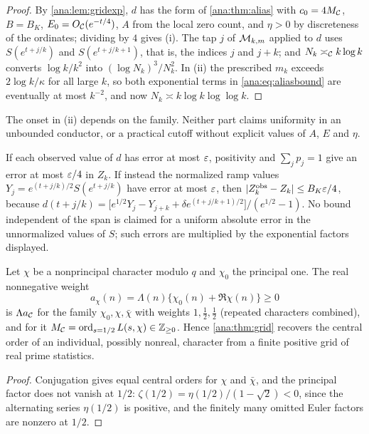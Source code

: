 \begin{proof}
By \cref{ana:lem:gridexp}, $d$ has the form of \cref{ana:thm:alias} with $c_0=4M_{\mathcal{C}}$,
$B=B_K$, $E_0=O_{\mathcal{C}}(e^{-t/4})$, $A$ from the local zero count, and $\eta>0$ by discreteness
of the ordinates; dividing by $4$ gives (i). The tap $j$ of $\mathcal{M}_{k,m}$ applied to $d$ uses
$S(e^{t+j/k})$ and $S(e^{t+j/k+1})$, that is, the indices $j$ and $j+k$; and
$N_k\asymp_{\mathcal{C}} k\log k$ converts $\log k/k^2$ into $(\log N_k)^3/N_k^2$. In (ii) the
prescribed $m_k$ exceeds $2\log k/\kappa$ for all large $k$, so both exponential terms in
\eqref{ana:eq:aliasbound} are eventually at most $k^{-2}$, and now $N_k\asymp k\log k\log\log k$.
\end{proof}

The onset in (ii) depends on the family. Neither part claims uniformity in an unbounded
conductor, or a practical cutoff without explicit values of $A$, $E$ and $\eta$.

\begin{remark}[Noise]\label{ana:rem:gridnoise}
If each observed value of $d$ has error at most $\varepsilon$, positivity and $\sum_jp_j=1$ give an
error at most $\varepsilon/4$ in $Z_k$. If instead the normalized ramp values
$Y_j=e^{(t+j/k)/2}S(e^{t+j/k})$ have error at most $\varepsilon$, then
$\lvert Z_k^{\mathrm{obs}}-Z_k\rvert\le B_K\varepsilon/4$, because
$d(t+j/k)=\bigl[e^{1/2}Y_j-Y_{j+k}+\delta e^{(t+j/k+1)/2}\bigr]/(e^{1/2}-1)$. No bound independent
of the span is claimed for a uniform absolute error in the unnormalized values of $S$; such errors
are multiplied by the exponential factors displayed.
\end{remark}

\begin{corollary}\label{ana:cor:gridchar}
Let $\chi$ be a nonprincipal character modulo $q$ and $\chi_0$ the principal one. The real
nonnegative weight
\[
 a_\chi(n)=\Lambda(n)\bigl\{\chi_0(n)+\Re\chi(n)\bigr\}\ge0
\]
is $\Lambda a_{\mathcal{C}}$ for the family $\chi_0,\chi,\bar\chi$ with weights $1,\frac12,\frac12$
(repeated characters combined), and for it $M_{\mathcal{C}}=\operatorname{ord}_{s=1/2}L(s,\chi)\in\mathbb{Z}_{\ge0}$. Hence
\cref{ana:thm:grid} recovers the central order of an individual, possibly nonreal, character
from a finite positive grid of real prime statistics.
\end{corollary}

\begin{proof}
Conjugation gives equal central orders for $\chi$ and $\bar\chi$, and the principal factor does
not vanish at $1/2$: $\zeta(1/2)=\eta(1/2)/(1-\sqrt2)<0$, since the alternating series
$\eta(1/2)$ is positive, and the finitely many omitted Euler factors are nonzero at $1/2$.
\end{proof}

